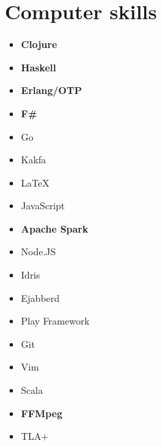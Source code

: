 \documentclass[11pt,a4paper,roman,english]{moderncv}        %
\begin{document}


\makecvtitle
\section{Computer skills}
\begin{multicols}{4}
	\begin{itemize}
		\item[] \textbf{Clojure}
		\item[] \textbf{Haskell}
		\item[] \textbf{Erlang/OTP}
		\item[] \textbf{F\#}
		\item[] Go
		\item[] Kakfa
		\item[] \LaTeX
		\item[] JavaScript
		\item[] \textbf{Apache Spark}
		\item[] Node.JS
	    \item[] Idris
		\item[] Ejabberd
		\item[] Play Framework
		\item[] Git
		\item[] Vim
		\item[] Scala
		\item[] \textbf{FFMpeg}
        \item[] TLA+
	\end{itemize}
\end{multicols}
\end{document}
